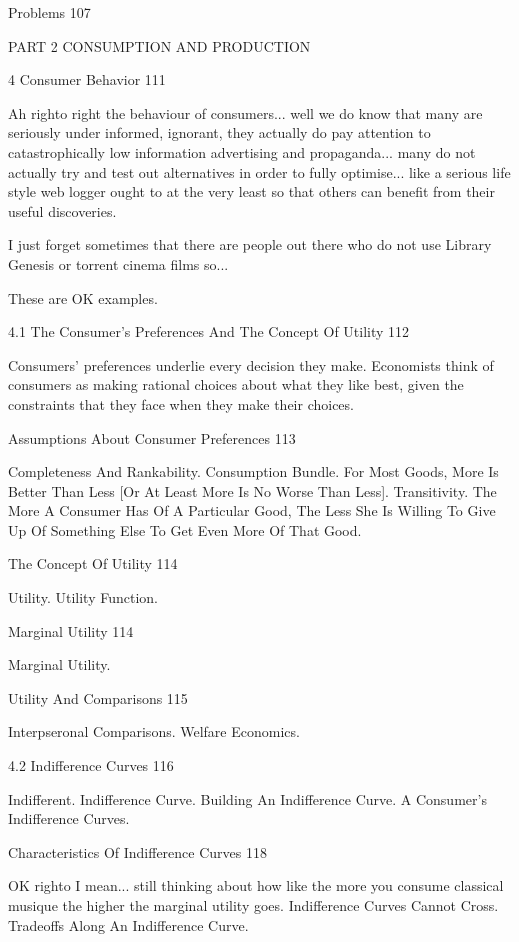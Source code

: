 Problems 107



PART 2 CONSUMPTION AND PRODUCTION



4 Consumer Behavior 111

Ah righto right the behaviour of consumers... well we do know that many are seriously under informed, ignorant, they actually do pay attention to catastrophically low information advertising and propaganda... many do not actually try and test out alternatives in order to fully optimise... like a serious life style web logger ought to at the very least so that others can benefit from their useful discoveries.

I just forget sometimes that there are people out there who do not use Library Genesis or torrent cinema films so...

These are OK examples.

4.1 The Consumer's Preferences And The Concept Of Utility 112

Consumers' preferences underlie every decision they make. Economists think of consumers as making rational choices about what they like best, given the constraints that they face when they make their choices.

Assumptions About Consumer Preferences 113

Completeness And Rankability. Consumption Bundle. For Most Goods, More Is Better Than Less [Or At Least More Is No Worse Than Less]. Transitivity. The More A Consumer Has Of A Particular Good, The Less She Is Willing To Give Up Of Something Else To Get Even More Of That Good.

The Concept Of Utility 114

Utility. Utility Function.

Marginal Utility 114

Marginal Utility.

Utility And Comparisons 115

Interpseronal Comparisons. Welfare Economics.

4.2 Indifference Curves 116

Indifferent. Indifference Curve. Building An Indifference Curve. A Consumer's Indifference Curves.

Characteristics Of Indifference Curves 118

OK righto I mean... still thinking about how like the more you consume classical musique the higher the marginal utility goes. Indifference Curves Cannot Cross. Tradeoffs Along An Indifference Curve.

